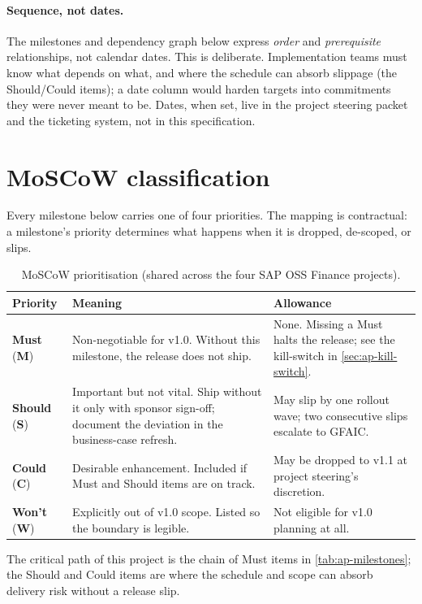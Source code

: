 \documentclass[11pt,a4paper,twoside]{report}
\begin{document}
\paragraph{Sequence, not dates.}
The milestones and dependency graph below express \emph{order} and
\emph{prerequisite} relationships, not calendar dates. This is
deliberate. Implementation teams must know what depends on what, and
where the schedule can absorb slippage (the Should/Could items); a
date column would harden targets into commitments they were never
meant to be. Dates, when set, live in the project steering packet and
the ticketing system, not in this specification.

\section{MoSCoW classification}\label{sec:ap-moscow}

Every milestone below carries one of four priorities. The mapping is
contractual: a milestone's priority determines what happens when it is
dropped, de-scoped, or slips.

\begin{table}[htbp]
\centering
\caption{MoSCoW prioritisation (shared across the four SAP OSS Finance
projects).}
\label{tab:ap-moscow}
\footnotesize
\begin{tabularx}{\linewidth}{@{}l l X@{}}
\toprule
\textbf{Priority} & \textbf{Meaning} & \textbf{Allowance} \\ \midrule
\textbf{Must} (\textbf{M}) & Non-negotiable for v1.0. Without this milestone, the release does not ship. & None. Missing a Must halts the release; see the kill-switch in \cref{sec:ap-kill-switch}. \\
\textbf{Should} (\textbf{S}) & Important but not vital. Ship without it only with sponsor sign-off; document the deviation in the business-case refresh. & May slip by one rollout wave; two consecutive slips escalate to GFAIC. \\
\textbf{Could} (\textbf{C}) & Desirable enhancement. Included if Must and Should items are on track. & May be dropped to v1.1 at project steering's discretion. \\
\textbf{Won't} (\textbf{W}) & Explicitly out of v1.0 scope. Listed so the boundary is legible. & Not eligible for v1.0 planning at all. \\
\bottomrule
\end{tabularx}
\end{table}

\noindent
The critical path of this project is the chain of Must items in
\cref{tab:ap-milestones}; the Should and Could items are where the
schedule and scope can absorb delivery risk without a release slip.
\end{document}
